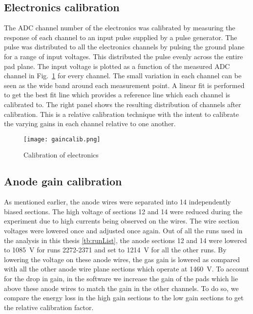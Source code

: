 

\subsection{Electronics calibration}
\label{sec:elecCalib}
The ADC channel number of the electronics was calibrated by measuring the response of each channel to an input pulse supplied by a pulse generator. The pulse was distributed to all the electronics channels by pulsing the ground plane for a range of input voltages. This distributed the pulse evenly across the entire pad plane. The input voltage is plotted as a function of the measured ADC channel in Fig.~\ref{fig:gaincalib} for every channel. The small variation in each channel can be seen as the wide band around each measurement point. A linear fit is performed to get the best fit line which provides a reference line which each channel is calibrated to. The right panel shows the resulting distribution of channels after calibration. This is a relative calibration technique with the intent to calibrate the varying gains in each channel relative to one another. 

\begin{figure}[H]
\texttt{[image: gaincalib.png]}
\caption{Calibration of electronics}
\label{fig:gaincalib}
\end{figure}

\subsection{Anode gain calibration}
\label{sec:anodeCalib}
As mentioned earlier, the anode wires were separated into 14 independently biased sections. The high voltage of sections 12 and 14 were reduced during the experiment due to high currents being observed on the wires. The wire section voltages were lowered once and adjusted once again. Out of all the runs used in the analysis in this thesis \ref{tb:runList}, the anode sections 12 and 14 were lowered to \SI{1085}{\volt} for runs 2272-2371 and set to \SI{1214}{\volt} for all the other runs. By lowering the voltage on these anode wires, the gas gain is lowered as compared with all the other anode wire plane sections which operate at \SI{1460}{\volt}. To account for the drop in gain, in the software we increase the gain of the pads which lie above these anode wires to match the gain in the other channels. To do so, we compare the energy loss in the high gain sections to the low gain sections to get the relative calibration factor. 


